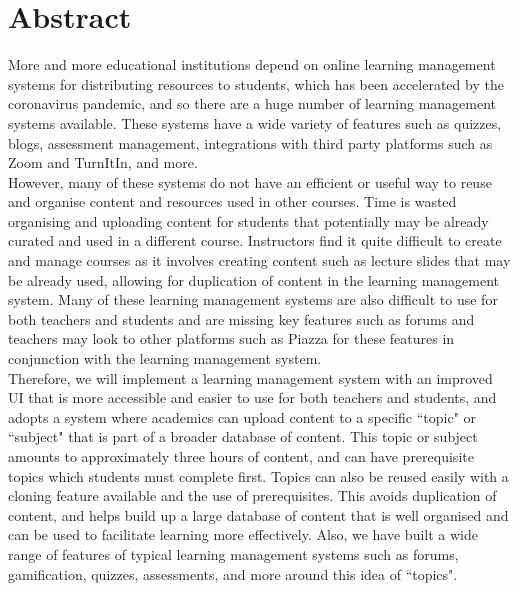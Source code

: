 \chapter*{Abstract}\label{abstract}
More and more educational institutions depend on online learning management systems for distributing resources to students, which has been accelerated by the coronavirus pandemic, and so there are a huge number of learning management systems available. These systems have a wide variety of features such as quizzes, blogs, assessment management, integrations with third party platforms such as Zoom and TurnItIn, and more. \\

However, many of these systems do not have an efficient or useful way to reuse and organise content and resources used in other courses. Time is wasted organising and uploading content for students that potentially may be already curated and used in a different course. Instructors find it quite difficult to create and manage courses as it involves creating content such as lecture slides that may be already used, allowing for duplication of content in the learning management system. Many of these learning management systems are also difficult to use for both teachers and students and are missing key features such as forums and teachers may look to other platforms such as Piazza for these features in conjunction with the learning management system. \\

Therefore, we will implement a learning management system with an improved UI that is more accessible and easier to use for both teachers and students, and adopts a system where academics can upload content to a specific ``topic" or ``subject" that is part of a broader database of content. This topic or subject amounts to approximately three hours of content, and can have prerequisite topics which students must complete first. Topics can also be reused easily with a cloning feature available and the use of prerequisites. This avoids duplication of content, and helps build up a large database of content that is well organised and can be used to facilitate learning more effectively. Also, we have built a wide range of features of typical learning management systems such as forums, gamification, quizzes, assessments, and more around this idea of ``topics". 